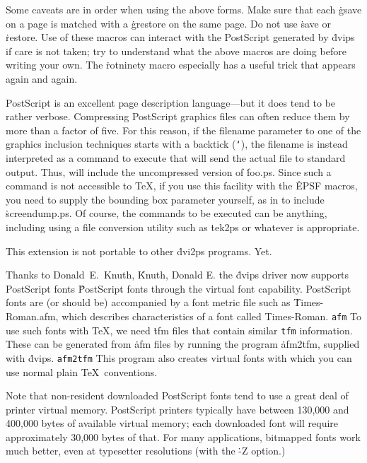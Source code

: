 Some caveats are in order when using the above forms.  Make sure that
each \.{gsave} on a page is matched with a \.{grestore} on the same
page.  Do not use \.{save} or \.{restore}.  Use of these macros can
interact with the PostScript generated by \.{dvips} if care is not
taken; try to understand what the above macros are doing before
writing your own.  The \.{rotninety} macro especially has a useful
trick that appears again and again.


PostScript is an excellent page description language---but it does
tend to be rather verbose.  Compressing PostScript graphics files can
often reduce them by more than a factor of five.  For this reason,
if the filename parameter to one of the graphics inclusion techniques
starts with a backtick ({\tt`}), the filename is instead interpreted
as a command to execute that will send the actual file to standard
output.  Thus,
\noindent
will include the uncompressed version of \.{foo.ps}.  Since such a
command is not accessible to \TeX, if you use this facility with
the \.{EPSF} macros, you need to supply the bounding box parameter
yourself, as in
\noindent
to include \.{screendump.ps}.  Of course, the commands to be executed can
be anything, including using a file conversion utility such as \.{tek2ps}
or whatever is appropriate.

This extension is not portable to other \.{dvi2ps} programs.  Yet.


Thanks to Donald~E.~Knuth,
\^{Knuth, Donald E.}
the \.{dvips} driver now supports PostScript fonts
\^{PostScript fonts}
through the virtual font capability.
PostScript fonts are (or should be) accompanied by a font metric file
such as \.{Times-Roman.afm},
which describes characteristics of a font called Times-Roman.
\^{{\tt afm}}
To use such fonts with \TeX, we need \.{tfm} files that contain similar
\^{{\tt tfm}}
information. These can be generated from \.{afm} files
by running the program \.{afm2tfm}, supplied with \.{dvips}.
\^{{\tt afm2tfm}}
This program also creates virtual fonts with which you can use normal
plain \TeX\ conventions.

Note that non-resident downloaded PostScript fonts tend to use a
great deal of printer virtual memory.  PostScript printers typically
have between 130,000 and 400,000 bytes of available virtual memory;
each downloaded font will require approximately 30,000 bytes of
that.  For many applications, bitmapped fonts work much better,
even at typesetter resolutions (with the \.{-Z} option.)

